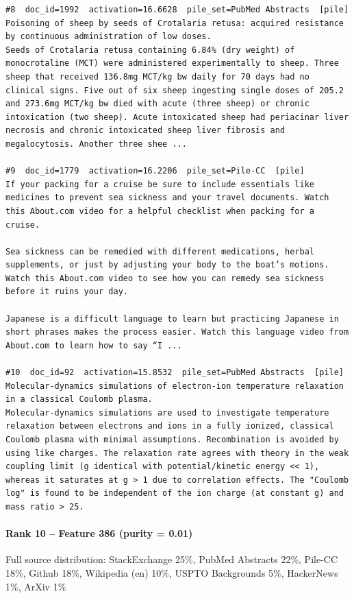 \begin{verbatim}
#8  doc_id=1992  activation=16.6628  pile_set=PubMed Abstracts  [pile]
Poisoning of sheep by seeds of Crotalaria retusa: acquired resistance by continuous administration of low doses.
Seeds of Crotalaria retusa containing 6.84% (dry weight) of monocrotaline (MCT) were administered experimentally to sheep. Three sheep that received 136.8mg MCT/kg bw daily for 70 days had no clinical signs. Five out of six sheep ingesting single doses of 205.2 and 273.6mg MCT/kg bw died with acute (three sheep) or chronic intoxication (two sheep). Acute intoxicated sheep had periacinar liver necrosis and chronic intoxicated sheep liver fibrosis and megalocytosis. Another three shee ...

#9  doc_id=1779  activation=16.2206  pile_set=Pile-CC  [pile]
If your packing for a cruise be sure to include essentials like medicines to prevent sea sickness and your travel documents. Watch this About.com video for a helpful checklist when packing for a cruise.

Sea sickness can be remedied with different medications, herbal supplements, or just by adjusting your body to the boat’s motions. Watch this About.com video to see how you can remedy sea sickness before it ruins your day.

Japanese is a difficult language to learn but practicing Japanese in short phrases makes the process easier. Watch this language video from About.com to learn how to say “I ...

#10  doc_id=92  activation=15.8532  pile_set=PubMed Abstracts  [pile]
Molecular-dynamics simulations of electron-ion temperature relaxation in a classical Coulomb plasma.
Molecular-dynamics simulations are used to investigate temperature relaxation between electrons and ions in a fully ionized, classical Coulomb plasma with minimal assumptions. Recombination is avoided by using like charges. The relaxation rate agrees with theory in the weak coupling limit (g identical with potential/kinetic energy << 1), whereas it saturates at g > 1 due to correlation effects. The "Coulomb log" is found to be independent of the ion charge (at constant g) and mass ratio > 25.

\end{verbatim}

\paragraph*{Rank 10 -- Feature 386 (purity = 0.01)}

Full source distribution: StackExchange 25\%, PubMed Abstracts 22\%, Pile-CC 18\%, Github 18\%, Wikipedia (en) 10\%, USPTO Backgrounds 5\%, HackerNews 1\%, ArXiv 1\%


